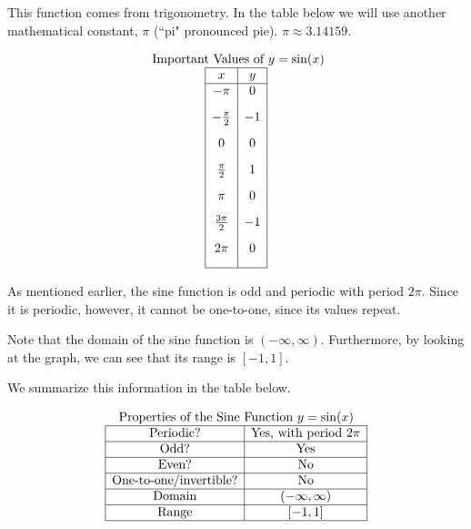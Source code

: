 \documentclass[nooutcomes]{ximera}
\begin{document}
This function comes from trigonometry. In the table below we will use another mathematical constant, $\pi$ (``pi" pronounced pie). $\pi \approx 3.14159$.

\begin{center}
\end{center}

\[
\begin{array}{ c }
 \text{ Important Values of  $y=\sin(x)$}\\
\begin{array}{|c|c|}
 \hline
 x & y\\
 \hline
 -\pi&0\\[2ex]
 -\frac{\pi}{2}&-1\\[2ex]
 0&0\\[2ex]
 \frac{\pi}{2}&1\\[2ex]
 \pi&0\\[2ex]
\frac{3\pi}{2}&-1\\[2ex]
 2 \pi&0\\[2ex]
\hline
\end{array}
\end{array}
\]


As mentioned earlier, the sine function is odd and periodic with period $2\pi$. Since it is periodic, however, it cannot be one-to-one, since its values repeat. 

Note that the domain of the sine function is $(-\infty, \infty)$. Furthermore, by looking at the graph, we can see that its range is $[-1, 1]$.

We summarize this information in the table below.


\[
\begin{array}{ c }
 \text{\normalfont Properties of the Sine Function } y=\sin(x) \\
\begin{array}{|c|c|}
 \hline
\text{Periodic?} & \text{Yes, with period }2\pi \\ \hline
\text{Odd?} & \text{Yes} \\ \hline
\text{Even?} & \text{No} \\ \hline
\text{One-to-one/invertible?} & \text{No} \\ \hline
\text{Domain} & (-\infty,\infty)\\ \hline
\text{Range} & [-1,1]\\ \hline
\end{array}
\end{array}
\]
\end{document}
